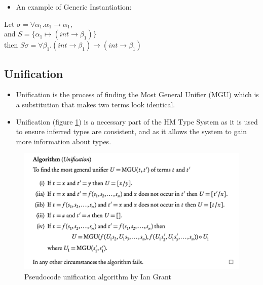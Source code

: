 \begin{itemize}
    \item An example of Generic Instantiation:
  \end{itemize}
  
  \begin{center}
      Let $\sigma = \forall\alpha_1. \alpha_1\rightarrow\alpha_1$, \\
and $S = \{\alpha_1 \mapsto (int \rightarrow\beta_1)\}$ \\
then $S\sigma = \forall \beta_1. (int \rightarrow\beta_1) \rightarrow (int \rightarrow\beta_1)$
  \end{center}
  
\subsection{Unification}
  \begin{itemize}
    \item Unification is the process of finding the Most General Unifier (MGU) which is a substitution that makes two terms look identical.
    \item Unification (figure \ref{fig:unification}) is a necessary part of the HM Type System as it is used to ensure inferred types are consistent, and as it allows the system to gain more information about types.
  \end{itemize}
  
  \begin{figure}[H]
      \centering
      \includegraphics[width=0.8\linewidth]{images/unification.png}
      \caption{Pseudocode unification algorithm by Ian Grant}
      \label{fig:unification}
  \end{figure}

